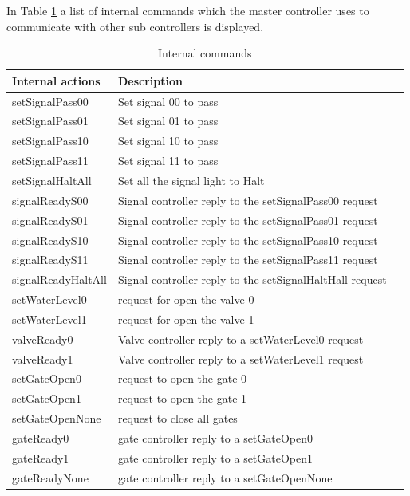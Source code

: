 \noindent In Table \ref{tab:internal} a list of internal commands which the master controller uses to communicate with other sub controllers is displayed.

\begin{table}[htbp]
	\centering
	\begin{tabular}{lll}
		\toprule
		\textbf{Internal actions} & \textbf{Description} \\
		\midrule
		setSignalPass00 & Set signal 00 to pass  \\
		setSignalPass01 & Set signal 01 to pass  \\
		setSignalPass10 & Set signal 10 to pass  \\
		setSignalPass11 & Set signal 11 to pass  \\
		setSignalHaltAll & Set all the signal light to Halt\\
		signalReadyS00 & Signal controller reply to the setSignalPass00 request \\
		signalReadyS01 & Signal controller reply to the setSignalPass01 request \\
		signalReadyS10 & Signal controller reply to the setSignalPass10 request \\
		signalReadyS11 & Signal controller reply to the setSignalPass11 request \\
		signalReadyHaltAll & Signal controller reply to the setSignalHaltHall request \\
		setWaterLevel0 & request for open the valve 0 \\
		setWaterLevel1 & request for open the valve 1 \\
		valveReady0 & Valve controller reply to a setWaterLevel0 request\\
		valveReady1 & Valve controller reply to a setWaterLevel1 request\\
		setGateOpen0 & request to open the gate 0\\
		setGateOpen1 & request to open the gate 1\\
		setGateOpenNone & request to close all gates\\
		gateReady0 & gate controller reply to a setGateOpen0\\
		gateReady1 & gate controller reply to a setGateOpen1\\
		gateReadyNone & gate controller reply to a setGateOpenNone\\
		\bottomrule
	\end{tabular}%
	\caption{Internal commands}
	\label{tab:internal}%
\end{table}%

